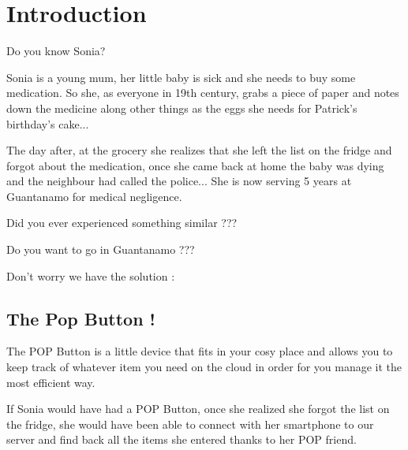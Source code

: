 \documentclass[12pt,a4paper,landscape]{article}
\begin{document}
\section*{\centering Introduction}
	\begin{multicols}{2}
	Do you know Sonia?
	
	Sonia is a young mum, her little baby is sick and she needs to buy some medication.
	So she, as everyone in 19th century, grabs a piece of paper and notes down the medicine along other things as the eggs she needs for Patrick's birthday's cake...
	
	The day after, at the grocery she realizes that she left the list on the fridge and forgot about the medication, once she came back at home the baby was dying and the neighbour had called the police... She is now serving 5 years at Guantanamo for medical negligence.
	
	\vspace{1em}

	Did you ever experienced something similar ???\\

	\vspace{1em}

	Do you want to go in Guantanamo ???\\

	\vspace{2em}
	
	Don't worry we have the solution :
	
	\subsection*{\centering The Pop Button !}
	
	The POP Button is a little device that fits in your cosy place and allows you to keep track of whatever item you need on the cloud in order for you manage it the most efficient way.
	
	If Sonia would have had a POP Button, once she realized she forgot the list on the fridge, she would have been able to connect with her smartphone to our server and find back all the items she entered thanks to her POP friend.
	
	\end{multicols}
	
\newpage
{}
\end{document}
